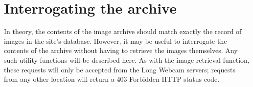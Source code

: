 \documentclass[11pt]{article}
\begin{document}
\section{Interrogating the archive}
In theory, the contents of the image archive should match exactly the record of images in the site's database. However, it may be useful to interrogate the contents of the archive without having to retrieve the images themselves. Any such utility functions will be described here. As with the image retrieval function, these requests will only be accepted from the Long Webcam servers; requests from any other location will return a 403 Forbidden HTTP status code.
\end{document}
